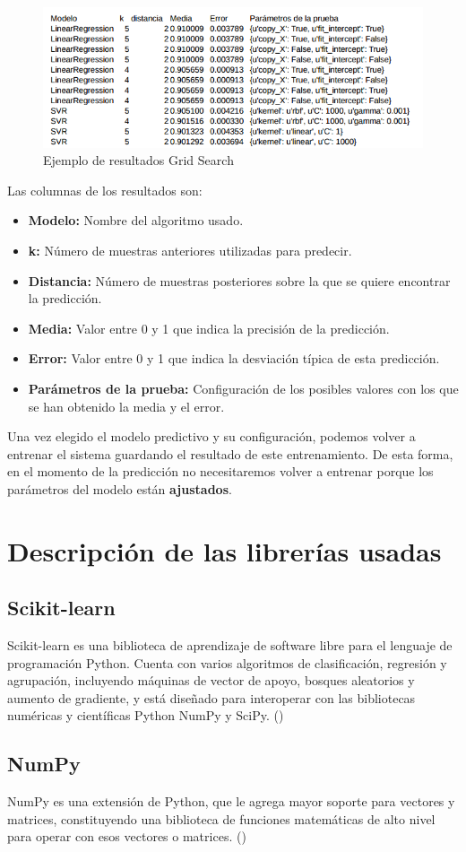 	\begin{figure}[htb]
		\begin{center}
			\includegraphics[width=17cm]{figures/resultados_grid_csv.png}
			\caption{Ejemplo de resultados Grid Search}
		\end{center}
		\label{csv}
	\end{figure}

	Las columnas de los resultados son:
	\begin{itemize}
		\item \textbf{Modelo:} Nombre del algoritmo usado.
		\item \textbf{k:} Número de muestras anteriores utilizadas para predecir.
		\item \textbf{Distancia:} Número de muestras posteriores sobre la que se quiere encontrar la predicción.
		\item \textbf{Media:} Valor entre 0 y 1 que indica la precisión de la predicción.
		\item \textbf{Error:} Valor entre 0 y 1 que indica la desviación típica de esta predicción.
		\item \textbf{Parámetros de la prueba:} Configuración de los posibles valores con los que se han obtenido la media y el error.
	\end{itemize}

	Una vez elegido el modelo predictivo y su configuración, podemos volver a entrenar el sistema guardando el resultado de este entrenamiento. De esta forma, en el momento de la predicción no necesitaremos volver a entrenar porque los parámetros del modelo están \textbf{ajustados}.

\section{Descripción de las librerías usadas}
\label{makereference4.5}
	\subsection{Scikit-learn}
	\label{makereference4.5.1}
	Scikit-learn es una biblioteca de aprendizaje de software libre para el lenguaje de programación Python. Cuenta con varios algoritmos de clasificación, regresión y agrupación, incluyendo máquinas de vector de apoyo, bosques aleatorios y aumento de gradiente, y está diseñado para interoperar con las bibliotecas numéricas y científicas Python NumPy y SciPy. (\cite{ARP:Scikit:2017})
	
	\subsection{NumPy}
	\label{makereference4.5.2}
	NumPy es una extensión de Python, que le agrega mayor soporte para vectores y matrices, constituyendo una biblioteca de funciones matemáticas de alto nivel para operar con esos vectores o matrices. (\cite{ARP:Numpy:2017})